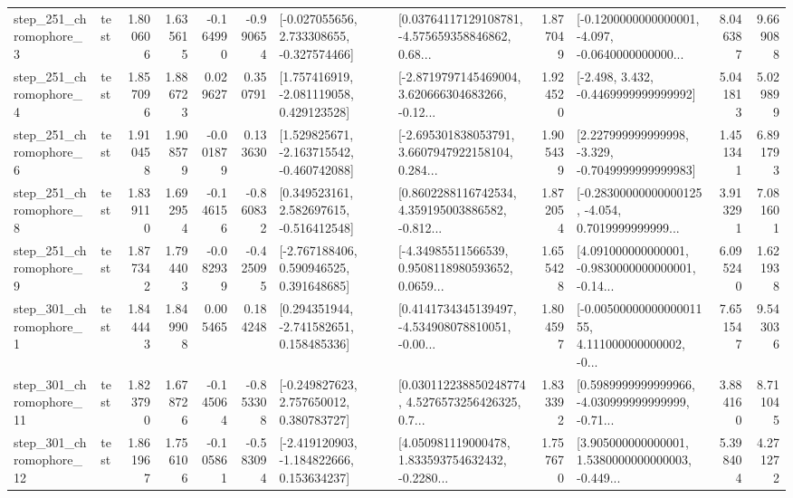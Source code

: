 \begin{tabular}{llrrrrllrlrr}
   step\_251\_chromophore\_3 &      test &      1.800606 &    1.635615 &     -0.164990 & -0.990654 &   [-0.027055656, 2.733308655, -0.327574466] &  [0.03764117129108781, -4.575659358846862, 0.68... &       1.877049 &  [-0.1200000000000001, -4.097, -0.0640000000000... &            8.046387 &          9.669088 \\
   step\_251\_chromophore\_4 &      test &      1.857096 &    1.886723 &      0.029627 &  0.350791 &    [1.757416919, -2.081119058, 0.429123528] &  [-2.8719797145469004, 3.620666304683266, -0.12... &       1.924520 &               [-2.498, 3.432, -0.4469999999999992] &            5.041813 &          5.029899 \\
   step\_251\_chromophore\_6 &      test &      1.910458 &    1.908579 &     -0.001879 &  0.133630 &   [1.529825671, -2.163715542, -0.460742088] &  [-2.695301838053791, 3.6607947922158104, 0.284... &       1.905439 &   [2.227999999999998, -3.329, -0.7049999999999983] &            1.451341 &          6.891793 \\
   step\_251\_chromophore\_8 &      test &      1.839110 &    1.692954 &     -0.146156 & -0.860832 &    [0.349523161, 2.582697615, -0.516412548] &  [0.8602288116742534, 4.359195003886582, -0.812... &       1.872054 &  [-0.28300000000000125, -4.054, 0.7019999999999... &            3.913291 &          7.081601 \\
   step\_251\_chromophore\_9 &      test &      1.877342 &    1.794403 &     -0.082939 & -0.425095 &    [-2.767188406, 0.590946525, 0.391648685] &  [-4.34985511566539, 0.9508118980593652, 0.0659... &       1.655428 &  [4.091000000000001, -0.9830000000000001, -0.14... &            6.095240 &          1.621938 \\
   step\_301\_chromophore\_1 &      test &      1.844443 &    1.849908 &      0.005465 &  0.184248 &    [0.294351944, -2.741582651, 0.158485336] &  [0.4141734345139497, -4.534908078810051, -0.00... &       1.804597 &  [-0.0050000000000001155, 4.111000000000002, -0... &            7.651547 &          9.543036 \\
  step\_301\_chromophore\_11 &      test &      1.823790 &    1.678726 &     -0.145064 & -0.853308 &    [-0.249827623, 2.757650012, 0.380783727] &  [0.030112238850248774, 4.5276573256426325, 0.7... &       1.833392 &  [0.5989999999999966, -4.030999999999999, -0.71... &            3.884160 &          8.711045 \\
  step\_301\_chromophore\_12 &      test &      1.861967 &    1.756106 &     -0.105861 & -0.583094 &   [-2.419120903, -1.184822666, 0.153634237] &  [4.050981119000478, 1.833593754632432, -0.2280... &       1.757670 &  [3.905000000000001, 1.5380000000000003, -0.449... &            5.398404 &          4.271272 \\

\end{tabular}
